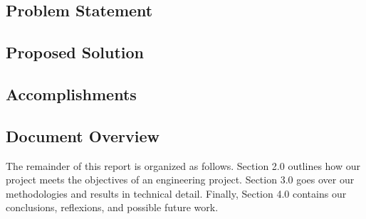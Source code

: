 \subsection{Problem Statement}\label{subsec:problem-statement}

\subsection{Proposed Solution}\label{subsec:proposed-solution}

\subsection{Accomplishments}\label{subsec:accomplishments}

\subsection{Document Overview}\label{subsec:document-overview}
The remainder of this report is organized as follows.
Section 2.0 outlines how our project meets the objectives of an engineering project.
Section 3.0 goes over our methodologies and results in technical detail.
Finally, Section 4.0 contains our conclusions, reflexions, and possible future work.
